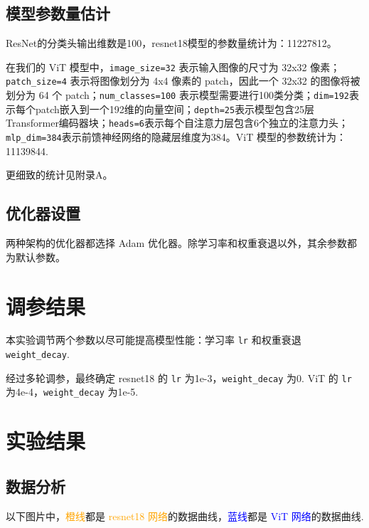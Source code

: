 \documentclass[notitlepage,cs4size,punct,oneside]{ctexrep}
\numberwithin{equation}{chapter}
\theoremstyle{mystyle}
\begin{document}
\subsection{模型参数量估计}
ResNet的分类头输出维数是100，resnet18模型的参数量统计为：11227812。

在我们的 ViT 模型中，\texttt{image\_size=32} 表示输入图像的尺寸为 32x32 像素；\texttt{patch\_size=4} 表示将图像划分为 4x4 像素的 patch，因此一个 32x32 的图像将被划分为 64 个 patch；\texttt{num\_classes=100} 表示模型需要进行100类分类；\texttt{dim=192}表示每个patch嵌入到一个192维的向量空间；\texttt{depth=25}表示模型包含25层Transformer编码器块；\texttt{heads=6}表示每个自注意力层包含6个独立的注意力头；\texttt{mlp\_dim=384}表示前馈神经网络的隐藏层维度为384。ViT 模型的参数统计为：11139844.

更细致的统计见附录A。

\subsection{优化器设置}
两种架构的优化器都选择 Adam 优化器。除学习率和权重衰退以外，其余参数都为默认参数。


\section{调参结果}
本实验调节两个参数以尽可能提高模型性能：学习率 \texttt{lr} 和权重衰退 \texttt{weight\_decay}.

经过多轮调参，最终确定 resnet18 的 \texttt{lr} 为1e-3，\texttt{weight\_decay} 为0. ViT 的 \texttt{lr} 为4e-4，\texttt{weight\_decay} 为1e-5.


\section{实验结果}
\subsection{数据分析}
以下图片中，\textcolor{orange}{橙线}都是 \textcolor{orange}{resnet18 网络}的数据曲线，\textcolor{blue}{蓝线}都是 \textcolor{blue}{ViT 网络}的数据曲线.
\end{document}

